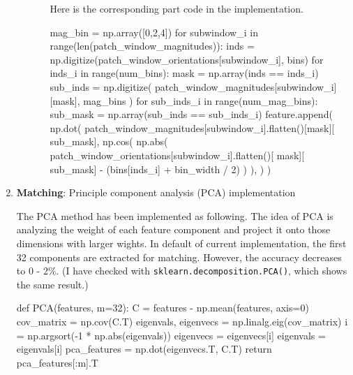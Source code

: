 \begin{enumerate}
\begin{itemize}
\begin{itemize}
         Here is the corresponding part code in the implementation.
         \begin{python}
mag_bin = np.array([0,2,4])
for subwindow_i in range(len(patch_window_magnitudes)):
    inds = np.digitize(patch_window_orientations[subwindow_i], bins)
    for inds_i in range(num_bins):
        mask = np.array(inds == inds_i)
        sub_inds = np.digitize(
        patch_window_magnitudes[subwindow_i][mask], mag_bins
            )
        for sub_inds_i in range(num_mag_bins):
            sub_mask = np.array(sub_inds == sub_inds_i)
            feature.append(
            np.dot(
            patch_window_magnitudes[subwindow_i].flatten()[mask][
                            sub_mask],
            np.cos(
            np.abs(
            patch_window_orientations[subwindow_i].flatten()[
                    mask][
                            sub_mask]
                    - (bins[inds_i] + bin_width / 2)
                            )
                        ),
                    )
                )
         \end{python}
        
       \end{itemize} 
   \end{itemize}
\newpage
   \item \textbf{Matching}: Principle component analysis (PCA) implementation
   
   The PCA method has been implemented as following. The idea of PCA is analyzing the weight of each feature component and project it onto those dimensions with larger wights. In default of current implementation, the first 32 components are extracted for matching. However, the accuracy decreases to 0 - 2\%. (I have checked with \verb|sklearn.decomposition.PCA()|, which shows the same result.)
   \begin{python}
def PCA(features, m=32):
    C = features - np.mean(features, axis=0)
    cov_matrix = np.cov(C.T)
    eigenvals, eigenvecs = np.linalg.eig(cov_matrix)
    i = np.argsort(-1 * np.abs(eigenvals))
    eigenvecs = eigenvecs[i]
    eigenvals = eigenvals[i]
    pca_features = np.dot(eigenvecs.T, C.T)
    return pca_features[:m].T
   \end{python}

\end{enumerate}



